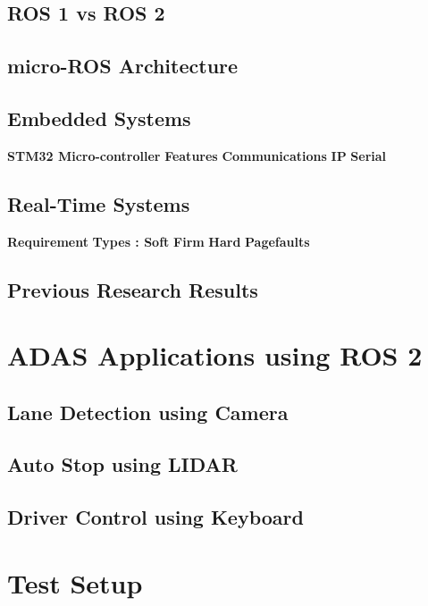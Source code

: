 \documentclass[%
xelatex,
	oneside,		%
	12pt,			%
	parskip=half,	%
	abstracton,
	chapterprefix=true%
    appendixprefix=true]
{scrbook}
\begin{document}
	
\vspace*{0.5cm}
	\section{ROS 1 vs ROS 2}	
	
	\section{micro-ROS Architecture}

	\section{Embedded Systems}
	{\bfseries STM32 Micro-controller}
	{\bfseries Features}
	{\bfseries Communications  }
	{\bfseries IP}
	{\bfseries Serial}
	
	\section{Real-Time Systems}
	{\bfseries	Requirement}
	{\bfseries	Types : Soft}
	{\bfseries	Firm}
	{\bfseries	Hard}
	{\bfseries Pagefaults}	
	\section{Previous Research Results}

	\chapter{ADAS Applications using ROS 2}
		
\rofoot[\pagemark]{\pagemark}
		\section{Lane Detection using Camera}
		\section{Auto Stop using LIDAR}
		\section{Driver Control using Keyboard}	
	
	
	
	\chapter{Test Setup}
		
\end{document}
